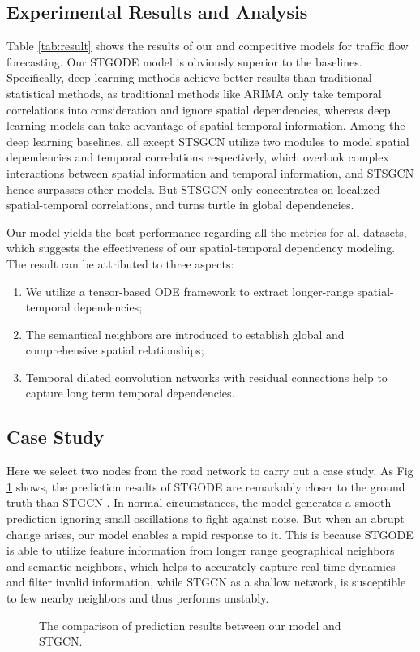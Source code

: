 \documentclass[sigconf]{acmart}
\theoremstyle{definition}
\begin{document}
\subsection{Experimental Results and Analysis}



Table \ref{tab:result} shows the results of our and competitive models for traffic flow forecasting. Our STGODE model is obviously superior to the baselines.
Specifically, deep learning methods achieve better results than traditional statistical methods, as traditional methods like ARIMA only take temporal correlations into consideration and ignore spatial dependencies, whereas deep learning models can take advantage of spatial-temporal information. Among the deep learning baselines, all except STSGCN utilize two modules to model spatial dependencies and temporal correlations respectively, which overlook complex interactions between spatial information and temporal information, and STSGCN hence surpasses other models. But STSGCN only concentrates on localized spatial-temporal correlations, and turns turtle in global dependencies.

Our model yields the best performance regarding all the metrics for all datasets, which suggests the effectiveness of our spatial-temporal dependency modeling. The result can be attributed to three aspects:
\begin{enumerate}
  \item We utilize a tensor-based ODE framework to extract longer-range spatial-temporal dependencies;
  \item The semantical neighbors are introduced to establish global and comprehensive spatial relationships;
  \item Temporal dilated convolution networks with residual connections help to capture long term temporal dependencies.
\end{enumerate}

\subsection{Case Study}
Here we select two nodes from the road network to carry out a case study. As Fig \ref{fig:case} shows, the prediction results of STGODE are remarkably closer to the ground truth than STGCN \cite{yu2018spatio}. In normal circumstances, the model generates a smooth prediction ignoring small oscillations to fight against noise. But when an abrupt change arises, our model enables a rapid response to it. This is because STGODE is able to utilize feature information from longer range geographical neighbors and semantic neighbors, which helps to accurately capture real-time dynamics and filter invalid information, while STGCN as a shallow network, is susceptible to few nearby neighbors and thus performs unstably. 
\begin{figure}[ht]
  \centering
  \caption{The comparison of prediction results between our model and STGCN.}
  \label{fig:case}
\end{figure}
\end{document}
